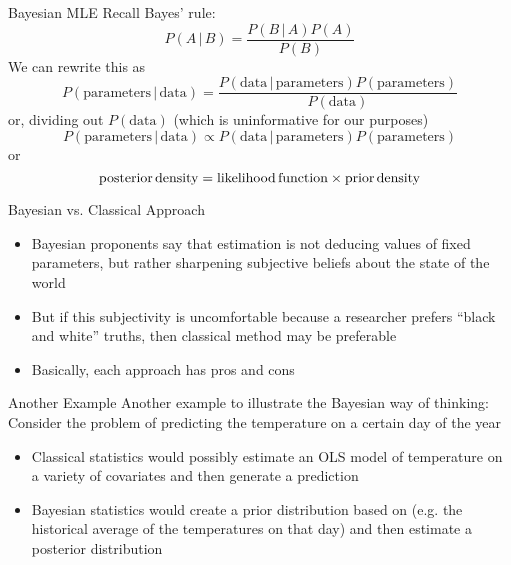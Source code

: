 \documentclass[english,xcolor=dvipsnames]{beamer}
\begin{document}
\begin{frame}{Bayesian MLE}
Recall Bayes' rule:
\[
P(A\,\vert\,B) = \frac{P(B\,\vert\,A)P(A)}{P(B)}
\]
We can rewrite this as
\[
P(\textrm{parameters}\,\vert\,\textrm{data}) = \frac{P(\textrm{data}\,\vert\,\textrm{parameters}) P(\textrm{parameters})}{P(\textrm{data})}
\]
or, dividing out $P(\textrm{data})$ (which is uninformative for our purposes)
\[
P(\textrm{parameters}\,\vert\,\textrm{data}) \propto P(\textrm{data}\,\vert\,\textrm{parameters}) P(\textrm{parameters})
\]
or
\[
\textrm{posterior\,density} = \textrm{likelihood\,function}\times\textrm{prior\,density}
\]
\end{frame}

\begin{frame}{Bayesian vs. Classical Approach}
\begin{itemize}
	\item Bayesian proponents say that estimation is not deducing values of fixed parameters, but rather sharpening subjective beliefs about the state of the world
	\item But if this subjectivity is uncomfortable because a researcher prefers ``black and white'' truths, then classical method may be preferable
	\item Basically, each approach has pros and cons
\end{itemize}
\end{frame}

\begin{frame}{Another Example}
Another example to illustrate the Bayesian way of thinking: Consider the problem of predicting the temperature on a certain day of the year
\begin{itemize}
	\item Classical statistics would possibly estimate an OLS model of temperature on a variety of covariates and then generate a prediction
	\item Bayesian statistics would create a prior distribution based on (e.g. the historical average of the temperatures on that day) and then estimate a posterior distribution
\end{itemize}
\end{frame}
\end{document}
